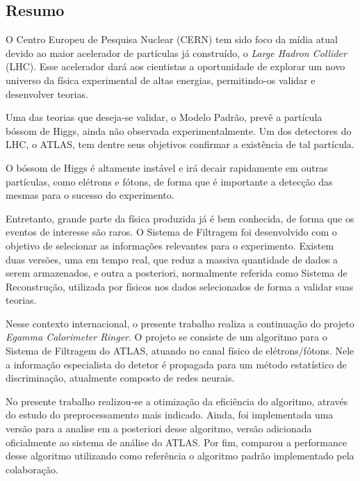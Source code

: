 \vfill
\begin{center}
\section*{Resumo\label{Resumo}}
\end{center}

O Centro Europeu de Pesquisa Nuclear (CERN) tem sido foco da mídia atual devido
ao maior acelerador de partículas já construído, o \emph{Large Hadron Collider} (LHC). Esse
acelerador dará aos cientistas a oportunidade de explorar um novo universo da física
experimental de altas energias, permitindo-os validar e desenvolver teorias.

Uma das teorias que deseja-se validar, o Modelo Padrão, prevê a partícula bóssom
de Higgs, ainda não observada experimentalmente. Um dos detectores do LHC, o
ATLAS, tem dentre seus objetivos confirmar a existência de tal partícula.

O bóssom de Higgs é altamente instável e irá decair rapidamente em outras
partículas, como elétrons e fótons, de forma que é importante a detecção das
mesmas para o sucesso do experimento.

Entretanto, grande parte da física produzida já é bem conhecida, de forma que 
os eventos de interesse são raros. O Sistema de Filtragem foi desenvolvido
com o objetivo de selecionar as informações relevantes para o experimento.
Existem duas versões, uma em tempo real, que reduz a massiva quantidade de dados
a serem armazenados, e outra a posteriori, normalmente referida como Sistema de
Reconstrução, utilizada por físicos nos dados selecionados de forma a validar suas teorias.

Nesse contexto internacional, o presente trabalho realiza a continuação
do projeto \emph{Egamma Calorimeter Ringer}. O projeto se consiste de um algoritmo 
para o Sistema de Filtragem do ATLAS, atuando no canal físico de
elétrons/fótons. Nele a informação especialista do detetor é propagada para um
método estatístico de discriminação, atualmente composto de redes neurais.

No presente trabalho realizou-se a otimização da eficiência do algoritmo, 
através do estudo do preprocessamento mais indicado. 
Ainda, foi implementada uma versão para a analise em 
a posteriori desse algoritmo, versão adicionada oficialmente ao
sistema de análise do ATLAS. Por fim, comparou a performance desse algoritmo 
utilizando como referência o algoritmo padrão implementado pela colaboração.

